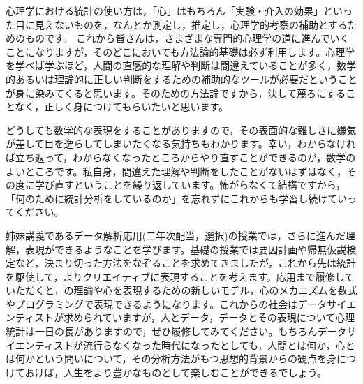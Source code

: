 \documentclass{ltjbook}
\begin{document}
心理学における統計の使い方は，「心」はもちろん「実験・介入の効果」といった目に見えないものを，なんとか測定し，推定し，心理学的考察の補助とするためのものです。
これから皆さんは，さまざまな専門的心理学の道に進んでいくことになりますが，そのどこにおいても方法論的基礎は必ず利用します。心理学を学べば学ぶほど，人間の直感的な理解や判断は間違えていることが多く，数学的あるいは理論的に正しい判断をするための補助的なツールが必要だということが身に染みてくると思います。そのための方法論ですから，決して蔑ろにすることなく，正しく身につけてもらいたいと思います。

どうしても数学的な表現をすることがありますので，その表面的な難しさに嫌気が差して目を逸らしてしまいたくなる気持ちもわかります。幸い，わからなければ立ち返って，わからなくなったところからやり直すことができるのが，数学のよいところです。私自身，間違えた理解や判断をしたことがないはずはなく，その度に学び直すということを繰り返しています。怖がらなくて結構ですから，「何のために統計分析をしているのか」を忘れずにこれからも学習し続けていってください。


姉妹講義であるデータ解析応用(二年次配当，選択)の授業では，さらに進んだ理解，表現ができるようなことを学びます。基礎の授業では要因計画や帰無仮説検定など，決まり切った方法をなぞることを求めてきましたが，これから先は統計を駆使して，よりクリエイティブに表現することを考えます。応用まで履修していただくと，の理論や心を表現するための新しいモデル，心のメカニズムを数式やプログラミングで表現できるようになります。これからの社会はデータサイエンティストが求められていますが，人とデータ，データとその表現について心理統計は一日の長がありますので，ぜひ履修してみてください。もちろんデータサイエンティストが流行らなくなった時代になったとしても，人間とは何か，心とは何かという問いについて，その分析方法がもつ思想的背景からの観点を身につけておけば，人生をより豊かなものとして楽しむことができるでしょう。
\end{document}
